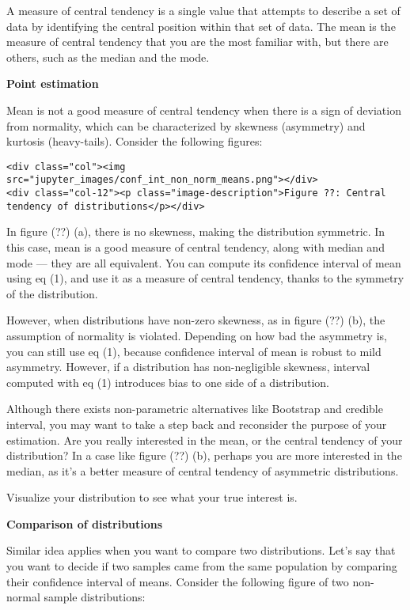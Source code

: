 \documentclass[11pt]{article}
\begin{document}
A measure of central tendency is a single value that attempts to
describe a set of data by identifying the central position within that
set of data. The mean is the measure of central tendency that you are
the most familiar with, but there are others, such as the median and the
mode.

\textbf{Point estimation}

Mean is not a good measure of central tendency when there is a sign of
deviation from normality, which can be characterized by skewness
(asymmetry) and kurtosis (heavy-tails). Consider the following figures:

\begin{verbatim}
<div class="col"><img src="jupyter_images/conf_int_non_norm_means.png"></div>
<div class="col-12"><p class="image-description">Figure ??: Central tendency of distributions</p></div>
\end{verbatim}

In figure (??) (a), there is no skewness, making the distribution
symmetric. In this case, mean is a good measure of central tendency,
along with median and mode --- they are all equivalent. You can compute
its confidence interval of mean using eq (1), and use it as a measure of
central tendency, thanks to the symmetry of the distribution.

However, when distributions have non-zero skewness, as in figure (??)
(b), the assumption of normality is violated. Depending on how bad the
asymmetry is, you can still use eq (1), because confidence interval of
mean is robust to mild asymmetry. However, if a distribution has
non-negligible skewness, interval computed with eq (1) introduces bias
to one side of a distribution.

Although there exists non-parametric alternatives like Bootstrap and
credible interval, you may want to take a step back and reconsider the
purpose of your estimation. Are you really interested in the mean, or
the central tendency of your distribution? In a case like figure (??)
(b), perhaps you are more interested in the median, as it's a better
measure of central tendency of asymmetric distributions.

Visualize your distribution to see what your true interest is.

\textbf{Comparison of distributions}

Similar idea applies when you want to compare two distributions. Let's
say that you want to decide if two samples came from the same population
by comparing their confidence interval of means. Consider the following
figure of two non-normal sample distributions:
\end{document}
